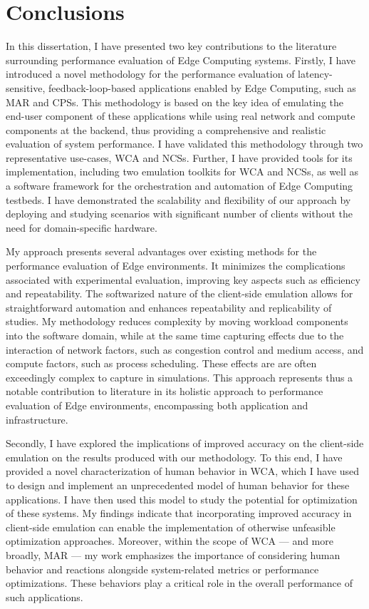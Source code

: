 \section{Conclusions}

In this dissertation, I have presented two key contributions to the literature surrounding performance evaluation of Edge Computing systems.
Firstly, I have introduced a novel methodology for the performance evaluation of latency-sensitive, feedback-loop-based applications enabled by Edge Computing, such as \gls{MAR} and \glspl{CPS}.
This methodology is based on the key idea of emulating the end-user component of these applications while using real network and compute components at the backend, thus providing a comprehensive and realistic evaluation of system performance.
I have validated this methodology through two representative use-cases, \gls{WCA} and \glspl{NCS}.
Further, I have provided tools for its implementation, including two emulation toolkits for \gls{WCA} and \glspl{NCS}, as well as a software framework for the orchestration and automation of Edge Computing testbeds.
I have demonstrated the scalability and flexibility of our approach by deploying and studying scenarios with significant number of clients without the need for domain-specific hardware.

My approach presents several advantages over existing methods for the performance evaluation of Edge environments.
It minimizes the complications associated with experimental evaluation, improving key aspects such as efficiency and repeatability.
The softwarized nature of the client-side emulation allows for straightforward automation and enhances repeatability and replicability of studies.
My methodology reduces complexity by moving workload components into the software domain, while at the same time capturing effects due to the interaction of network factors, such as congestion control and medium access, and compute factors, such as process scheduling.
These effects are are often exceedingly complex to capture in simulations.
This approach represents thus a notable contribution to literature in its holistic approach to performance evaluation of Edge environments, encompassing both application and infrastructure.

Secondly, I have explored the implications of improved accuracy on the client-side emulation on the results produced with our methodology.
To this end, I have provided a novel characterization of human behavior in \gls{WCA}, which I have used to design and implement an unprecedented model of human behavior for these applications.
I have then used this model to study the potential for optimization of these systems.
My findings indicate that incorporating improved accuracy in client-side emulation can enable the implementation of otherwise unfeasible optimization approaches.
Moreover, within the scope of \gls{WCA} --- and more broadly, \gls{MAR} --- my work emphasizes the importance of considering human behavior and reactions alongside system-related metrics or performance optimizations.
These behaviors play a critical role in the overall performance of such applications.

